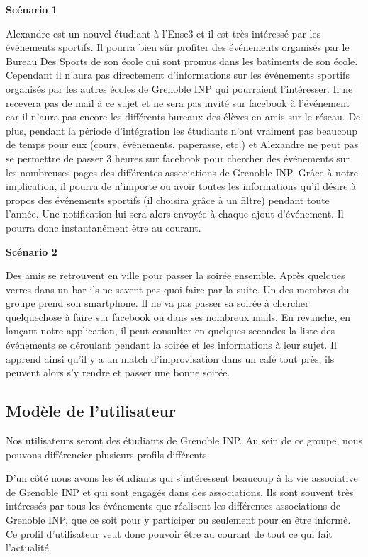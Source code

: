 \documentclass[a4paper, 11px]{article}
\begin{document}
{\bf Scénario 1} 

Alexandre est un nouvel étudiant à l'Ense3 et il est très intéressé par les événements sportifs. Il pourra bien sûr profiter des événements organisés par
le Bureau Des Sports de son école qui sont promus dans les batîments de son école. Cependant il n'aura pas directement d'informations sur les événements sportifs 
organisés par les autres écoles de Grenoble INP qui pourraient l'intéresser. Il ne recevera pas de mail à ce sujet et ne sera pas invité sur facebook
à l'événement car il n'aura pas encore les différents bureaux des élèves en amis sur le réseau. De plus, pendant la période d'intégration les étudiants n'ont vraiment pas beaucoup de temps pour eux (cours, événements, paperasse, etc.) et Alexandre ne peut pas se permettre de passer 3 heures sur facebook pour chercher des événements
sur les nombreuses pages des différentes associations de Grenoble INP. Grâce à notre implication, il pourra de n'importe ou avoir toutes les informations qu'il désire
à propos des événements sportifs (il choisira grâce à un filtre) pendant toute l'année. Une notification lui sera alors envoyée à chaque ajout d'événement. Il pourra donc
instantanément être au courant.

{\bf Scénario 2}

Des amis se retrouvent en ville pour passer la soirée ensemble. Après quelques verres dans un bar ils ne savent pas quoi faire par la suite. Un des membres du groupe
prend son smartphone. Il ne va pas passer sa soirée à chercher quelquechose à faire sur facebook ou dans ses nombreux mails. En revanche, en lançant notre application,
il peut consulter en quelques secondes la liste des événements se déroulant pendant la soirée et les informations à leur sujet. Il apprend ainsi qu'il y a un match d'improvisation dans un café tout près, ils peuvent alors s'y rendre et passer une bonne soirée.

\subsection{Modèle de l'utilisateur}

Nos utilisateurs seront des étudiants de Grenoble INP. Au sein de ce groupe, nous pouvons différencier plusieurs profils différents.

D'un côté nous avons les étudiants qui s'intéressent beaucoup à la vie associative de Grenoble INP et qui sont engagés dans des associations.
Ils sont souvent très intéressés par tous les événements que réalisent les différentes associations de Grenoble INP, que ce soit pour y participer ou seulement
pour en être informé. Ce profil d'utilisateur veut donc pouvoir être au courant de tout ce qui fait l'actualité.
\end{document}
